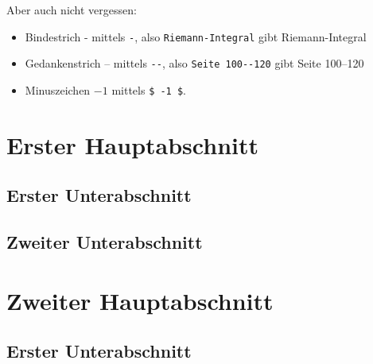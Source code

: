 \begin{refsection}
Aber auch nicht vergessen:
\begin{itemize}[nosep]
	\item
	Bindestrich - mittels \verb|-|, also \verb|Riemann-Integral| gibt Riemann-Integral
	\item
	Gedankenstrich -- mittels \verb|--|, also \verb|Seite 100--120| gibt Seite 100--120
	\item
	Minuszeichen $ -1 $ mittels \verb|$ -1 $|.
\end{itemize}


\section*{Erster Hauptabschnitt}		%
\subsection*{Erster Unterabschnitt}		%
\subsubsection{}	 \blindtext				%
\subsubsection{}	 \blindtext	
\subsection*{Zweiter Unterabschnitt}
\subsubsection{}	 \blindtext				%
\subsubsection{}	 \blindtext[2]				%
\section*{Zweiter Hauptabschnitt}		%
\subsection*{Erster Unterabschnitt}		%
\subsubsection{}	 \blindtext				%
\subsubsection{}	 \blindtext	

\RaggedRight
\printbibliography
\end{refsection}

